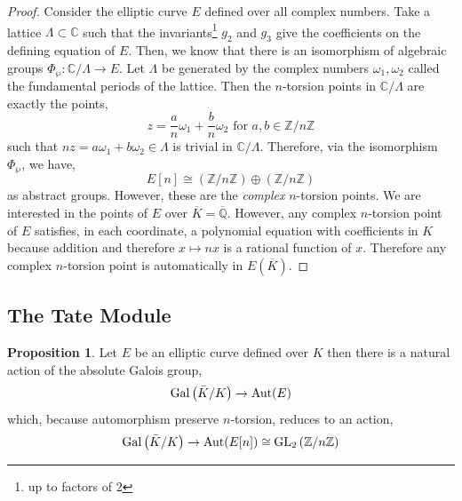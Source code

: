 \documentclass{article}
\newcommand{\Gal}[1]{\mathrm{Gal}\left( #1 \right)}
\newcommand{\Aut}[1]{\mathrm{Aut} \small(#1 \small)}
\newcommand{\GL}[2]{\mathrm{GL}_{#1}\left(#2\right)}
\newcommand{\Z}{\mathbb{Z}}
\newcommand{\Q}{\mathbb{Q}}
\newcommand{\C}{\mathbb{C}}
\theoremstyle{definition}
\newtheorem{proposition}[theorem]{Proposition}
\begin{document}
\begin{proof}
Consider the elliptic curve $E$ defined over all complex numbers. Take a lattice $\Lambda \subset \C$ such that the invariants\footnote{up to factors of $2$} $g_2$ and $g_3$ give the coefficients on the defining equation of $E$. Then, we know that there is an isomorphism of algebraic groups $\Phi_{\wp} : \C / \Lambda \to E$. Let $\Lambda$ be generated by the complex numbers $\omega_1, \omega_2$ called the fundamental periods of the lattice. Then the $n$-torsion points in $\C / \Lambda$ are exactly the points,
\[ z = \frac{a}{n} \omega_1 + \frac{b}{n} \omega_2 \text{ for } a,b \in \Z / n \Z \]
such that $n z = a \omega_1 + b \omega_2 \in \Lambda$ is trivial in $\C / \Lambda$. Therefore, via the isomorphism $\Phi_{\wp}$, we have,
\[ E[n] \cong (\Z / n \Z) \oplus (\Z / n \Z)\]
as abstract groups. However, these are the \textit{complex} $n$-torsion points. We are interested in the points of $E$ over $\overline{K} = \overline{\Q}$. However, any complex $n$-torsion point of $E$ satisfies, in each coordinate, a polynomial equation with coefficients in $K$ because addition and therefore $x \mapsto nx$ is a rational function of $x$. Therefore any complex $n$-torsion point is automatically in $E(\overline{K})$.        
\end{proof}

\subsection{The Tate Module}

\begin{proposition}
Let $E$ be an elliptic curve defined over $K$ then there is a natural action of the absolute Galois group,
\[ \Gal{\bar{K} / K} \to \Aut{E} \]
which, because automorphism preserve $n$-torsion, reduces to an action,
\[ \Gal{\bar{K} / K} \to \Aut{E[n]} \cong \GL{2}{\Z / n \Z} \] 
\end{proposition}
\end{document}
